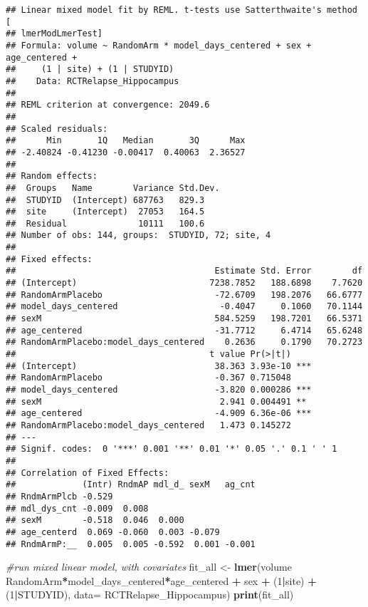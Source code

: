\documentclass[]{article}
\newenvironment{Shaded}{\begin{snugshade}}{\end{snugshade}}
\newcommand{\KeywordTok}[1]{\textcolor[rgb]{0.13,0.29,0.53}{\textbf{#1}}}
\newcommand{\DataTypeTok}[1]{\textcolor[rgb]{0.13,0.29,0.53}{#1}}
\newcommand{\DecValTok}[1]{\textcolor[rgb]{0.00,0.00,0.81}{#1}}
\newcommand{\StringTok}[1]{\textcolor[rgb]{0.31,0.60,0.02}{#1}}
\newcommand{\CommentTok}[1]{\textcolor[rgb]{0.56,0.35,0.01}{\textit{#1}}}
\newcommand{\OperatorTok}[1]{\textcolor[rgb]{0.81,0.36,0.00}{\textbf{#1}}}
\newcommand{\NormalTok}[1]{#1}
\theoremstyle{definition}
\theoremstyle{definition}
\theoremstyle{definition}
\theoremstyle{remark}
\begin{document}
\begin{verbatim}
## Linear mixed model fit by REML. t-tests use Satterthwaite's method [
## lmerModLmerTest]
## Formula: volume ~ RandomArm * model_days_centered + sex + age_centered +  
##     (1 | site) + (1 | STUDYID)
##    Data: RCTRelapse_Hippocampus
## 
## REML criterion at convergence: 2049.6
## 
## Scaled residuals: 
##      Min       1Q   Median       3Q      Max 
## -2.40824 -0.41230 -0.00417  0.40063  2.36527 
## 
## Random effects:
##  Groups   Name        Variance Std.Dev.
##  STUDYID  (Intercept) 687763   829.3   
##  site     (Intercept)  27053   164.5   
##  Residual              10111   100.6   
## Number of obs: 144, groups:  STUDYID, 72; site, 4
## 
## Fixed effects:
##                                       Estimate Std. Error        df
## (Intercept)                          7238.7852   188.6898    7.7620
## RandomArmPlacebo                      -72.6709   198.2076   66.6777
## model_days_centered                    -0.4047     0.1060   70.1144
## sexM                                  584.5259   198.7201   66.5371
## age_centered                          -31.7712     6.4714   65.6248
## RandomArmPlacebo:model_days_centered    0.2636     0.1790   70.2723
##                                      t value Pr(>|t|)    
## (Intercept)                           38.363 3.93e-10 ***
## RandomArmPlacebo                      -0.367 0.715048    
## model_days_centered                   -3.820 0.000286 ***
## sexM                                   2.941 0.004491 ** 
## age_centered                          -4.909 6.36e-06 ***
## RandomArmPlacebo:model_days_centered   1.473 0.145272    
## ---
## Signif. codes:  0 '***' 0.001 '**' 0.01 '*' 0.05 '.' 0.1 ' ' 1
## 
## Correlation of Fixed Effects:
##             (Intr) RndmAP mdl_d_ sexM   ag_cnt
## RndmArmPlcb -0.529                            
## mdl_dys_cnt -0.009  0.008                     
## sexM        -0.518  0.046  0.000              
## age_centerd  0.069 -0.060  0.003 -0.079       
## RndmArmP:__  0.005  0.005 -0.592  0.001 -0.001
\end{verbatim}

\begin{Shaded}
\begin{Highlighting}[]
\CommentTok{#run mixed linear model, with covariates}
\NormalTok{  fit_all <-}\StringTok{ }\KeywordTok{lmer}\NormalTok{(volume }\OperatorTok{~}\StringTok{ }\NormalTok{RandomArm}\OperatorTok{*}\NormalTok{model_days_centered}\OperatorTok{*}\NormalTok{age_centered }\OperatorTok{+}\StringTok{ }\NormalTok{sex }\OperatorTok{+}\StringTok{ }\NormalTok{(}\DecValTok{1}\OperatorTok{|}\NormalTok{site) }\OperatorTok{+}\StringTok{ }\NormalTok{(}\DecValTok{1}\OperatorTok{|}\NormalTok{STUDYID), }\DataTypeTok{data=}\NormalTok{ RCTRelapse_Hippocampus)}
  \KeywordTok{print}\NormalTok{(fit_all)}
\end{Highlighting}
\end{Shaded}
\end{document}

